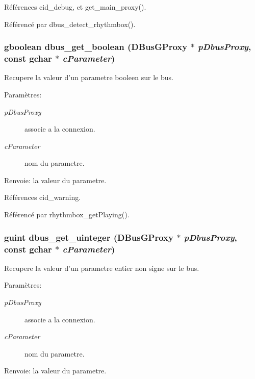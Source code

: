 Références cid\_\-debug, et get\_\-main\_\-proxy().

Référencé par dbus\_\-detect\_\-rhythmbox().
\subsubsection{\setlength{\rightskip}{0pt plus 5cm}gboolean dbus\_\-get\_\-boolean (DBusGProxy $\ast$ {\em pDbusProxy}, \/  const gchar $\ast$ {\em cParameter})}\label{cid-dbus_8c_d22399e4bc5784a6ca2679f32707f61a}


Recupere la valeur d'un parametre booleen sur le bus. \begin{Desc}
\item[Paramètres:]
\begin{description}
\item[{\em pDbusProxy}]associe a la connexion. \item[{\em cParameter}]nom du parametre. \end{description}
\end{Desc}
\begin{Desc}
\item[Renvoie:]la valeur du parametre. \end{Desc}


Références cid\_\-warning.

Référencé par rhythmbox\_\-getPlaying().
\subsubsection{\setlength{\rightskip}{0pt plus 5cm}guint dbus\_\-get\_\-uinteger (DBusGProxy $\ast$ {\em pDbusProxy}, \/  const gchar $\ast$ {\em cParameter})}\label{cid-dbus_8c_a0f6943fc8a248106a3453c6c9e35eb1}


Recupere la valeur d'un parametre entier non signe sur le bus. \begin{Desc}
\item[Paramètres:]
\begin{description}
\item[{\em pDbusProxy}]associe a la connexion. \item[{\em cParameter}]nom du parametre. \end{description}
\end{Desc}
\begin{Desc}
\item[Renvoie:]la valeur du parametre. \end{Desc}


